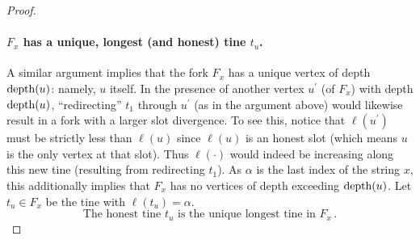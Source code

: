 \begin{proof}
    \paragraph{$F_x$ has a unique, longest (and honest) tine $t_u$.}
    A similar argument implies that the fork
    $F_x$ has a unique vertex of depth $\operatorname{depth}(u)$: namely, $u$ itself. In
    the presence of another vertex $u^\prime$ (of $F_x$) with depth
    $\operatorname{depth}(u)$, ``redirecting'' $t_1$ through $u^\prime$ (as in the
    argument above) would likewise result in a fork with 
    a larger slot divergence. 
    To see this, notice that $\ell(u^\prime)$ must be strictly less than $\ell(u)$ 
    since $\ell(u)$ is an honest slot (which means $u$ is the only vertex at that slot).
    Thus $\ell(\cdot)$ would indeed be increasing along
    this new tine (resulting from redirecting $t_1$).
    As $\alpha$ is the last index of the string $x$, this additionally
    implies that $F_x$ has no vertices of depth exceeding $\operatorname{depth}(u)$. 
    Let $t_u \in F_x$ be the tine with $\ell(t_u) = \alpha$. 
    \begin{equation}\label{eq:tu}
        \text{The honest tine $t_u$ is the unique longest tine in $F_x$}
        \,.
    \end{equation}
    
    

    


\end{proof}
